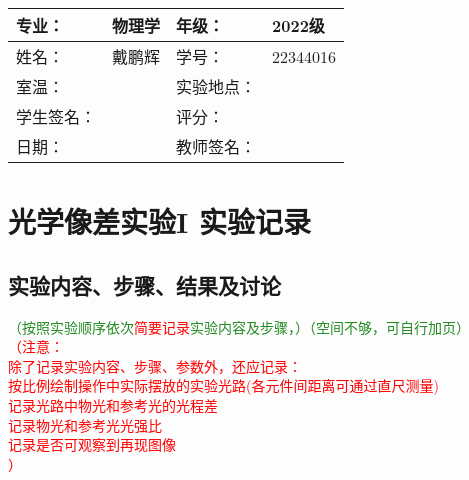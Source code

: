 \documentclass[dvipsnames, svgnames,a4paper,11pt]{article}
\begin{document}
\clearpage
\begin{table}
	\renewcommand\arraystretch{1.7}
	\centering
	\begin{tabularx}{\textwidth}{|X|X|X|X|}
	\hline
	专业：& 物理学 &年级：& 2022级 \\
	\hline
	姓名：& 戴鹏辉 & 学号：& 22344016 \\
	\hline
	室温：&  & 实验地点： &  \\
	\hline
	学生签名：& & 评分： &\\
	\hline
	日期：&  & 教师签名：&\\
	\hline
	\end{tabularx}
\end{table}

\section{光学像差实验I \quad\heiti 实验记录}
\subsection{实验内容、步骤、结果及讨论}\textcolor{ForestGreen}{（按照实验顺序依次}\textcolor{red}{简要记录}\textcolor{ForestGreen}{实验内容及步骤，）（空间不够，可自行加页）}\\
\textcolor{red}{
（注意： \\
除了记录实验内容、步骤、参数外，还应记录：\\
按比例绘制操作中实际摆放的实验光路(各元件间距离可通过直尺测量)\\
记录光路中物光和参考光的光程差\\
记录物光和参考光光强比\\
记录是否可观察到再现图像\\
）
}


		





\clearpage

\newpage

\null

\newpage

\null
\end{document}
